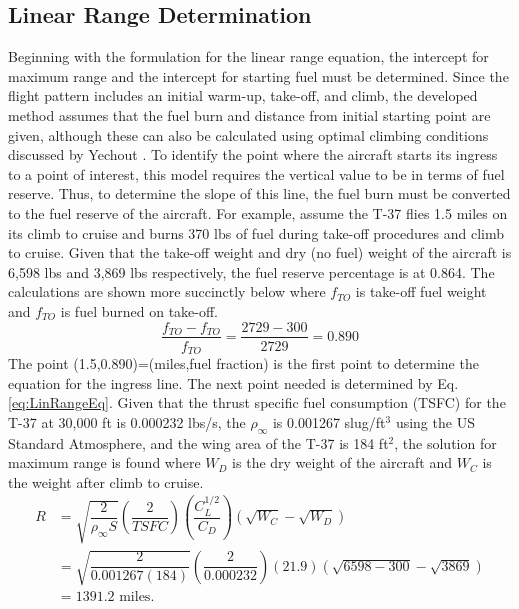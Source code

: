\subsection*{Linear Range Determination}
Beginning with the formulation for the linear range equation, the intercept for maximum range and the intercept for starting fuel must be determined. Since the flight pattern includes an initial warm-up, take-off, and climb, the developed method assumes that the fuel burn and distance from initial starting point are given, although these can also be calculated using optimal climbing conditions discussed by Yechout \cite{IntroACMechanics}. To identify the point where the aircraft starts its ingress to a point of interest, this model requires the vertical value to be in terms of fuel reserve. Thus, to determine the slope of this line, the fuel burn must be converted to the fuel reserve of the aircraft. For example, assume the T-37 flies 1.5 miles on its climb to cruise and burns 370 lbs of fuel during take-off procedures and climb to cruise. Given that the take-off weight and dry (no fuel) weight of the aircraft is 6,598 lbs and 3,869 lbs respectively, the fuel reserve percentage is at 0.864. The calculations are shown more succinctly below where $f_{TO}$ is take-off fuel weight and $f_{TO}$ is fuel burned on take-off.
\begin{equation}
    \dfrac{f_{TO}- f_{TO}}{f_{TO}} = \dfrac{2729-300}{2729} = 0.890
\end{equation}
The point (1.5,0.890)=(miles,fuel fraction) is the first point to determine the equation for the ingress line. The next point needed is determined by Eq. \ref{eq:LinRangeEq}. Given that the thrust specific fuel consumption (TSFC) for the T-37 at 30,000 ft is 0.000232 lbs/s, the $\rho_\infty$ is 0.001267 slug/ft$^3$ using the US Standard Atmosphere, and the wing area of the T-37 is 184 ft$^2$, the solution for maximum range is found where $W_D$ is the dry weight of the aircraft and $W_C$ is the weight after climb to cruise.
\begin{equation}
\begin{aligned}
    R  &= \sqrt{\dfrac{2}{\rho_{\infty}S}}\left(\dfrac{2}{TSFC}\right)\left(\dfrac{C_L^{1/2}}{C_D}\right)(\sqrt{W_C}-\sqrt{W_D})\\
    &= \sqrt{\dfrac{2}{0.001267(184)}}\left(\dfrac{2}{0.000232}\right)\left(21.9\right)(\sqrt{6598-300}-\sqrt{3869})\\
    &=1391.2\text{ miles}.
\end{aligned}
\end{equation}
